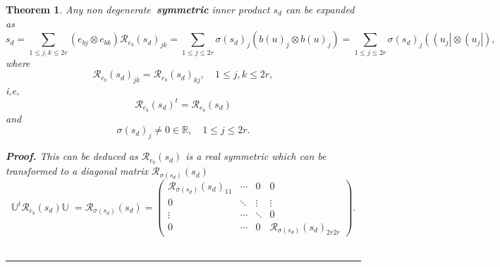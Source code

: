 \documentclass[aps,preprint]{revtex4}
\newtheorem{theorem}{Theorem}
\newenvironment{proof}[1][Proof]{\noindent\textbf{#1.} }{\ \rule{0.5em}{0.5em}}
\begin{document}
\begin{theorem}
Any non degenerate\textbf{\ symmetric }inner product $s_{d}$ can be expanded
as 
\begin{equation*}
s_{d}=\sum_{1\leq j,k\leq 2r}\left( e_{bj}\otimes e_{bk}\right) \mathcal{R}%
_{e_{b}}\left( s_{d}\right) _{jk}=\sum_{1\leq j\leq 2r}\sigma \left(
s_{d}\right) _{j}\left( b\left( u\right) _{j}\otimes b\left( u\right)
_{j}\right) =\sum_{1\leq j\leq 2r}\sigma \left( s_{d}\right) _{j}\left(
\left( u_{j}\right\vert \otimes \left( u_{j}\right\vert \right) ,
\end{equation*}%
where 
\begin{equation}
\mathcal{R}_{e_{b}}\left( s_{d}\right) _{jk}=\mathcal{R}_{e_{b}}\left(
s_{d}\right) _{kj},\quad 1\leq j,k\leq 2r,
\end{equation}%
i,e, 
\begin{equation}
\mathcal{R}_{e_{b}}\left( s_{d}\right) ^{t}=\mathcal{R}_{e_{b}}\left(
s_{d}\right)
\end{equation}%
and 
\begin{equation}
\sigma \left( s_{d}\right) _{j}\neq 0\in \mathbb{R},\quad 1\leq j\leq 2r.
\end{equation}

\begin{proof}
This can be deduced as $\mathcal{R}_{e_{b}}\left( s_{d}\right) $ is a real
symmetric which can be transformed to a diagonal matrix $\mathbb{\mathcal{R}}%
_{\sigma \left( s_{d}\right) }\left( s_{d}\right) $ 
\begin{equation}
\mathbb{U}^{t}\mathcal{R}_{e_{b}}\left( s_{d}\right) \mathbb{U}\,\,\mathbb{=%
\mathcal{R}}_{\sigma \left( s_{d}\right) }\left( s_{d}\right) =\left( 
\begin{array}{cccc}
\mathbb{\mathcal{R}}_{\sigma \left( s_{d}\right) }\left( s_{d}\right) _{11}
& \cdots & 0 & 0 \\ 
0 & \ddots & \vdots & \vdots \\ 
\vdots & \cdots & \ddots & 0 \\ 
0 & \cdots & 0 & \mathbb{\mathcal{R}}_{\sigma \left( s_{d}\right) }\left(
s_{d}\right) _{2r2r}%
\end{array}%
\right) .
\end{equation}
\end{proof}
\end{theorem}
\end{document}
